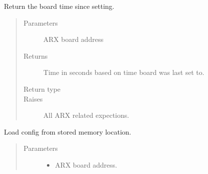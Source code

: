 \documentclass[letterpaper,10pt,english]{sphinxmanual}
\begin{document}
\begin{fulllineitems}
\begin{fulllineitems}
\begin{quote}
\begin{description}
\end{description}\end{quote}

\end{fulllineitems}


\begin{fulllineitems}
\label{\detokenize{index:lwautils.lwa_arx.ARX.get_time}}
Return the board time since setting.
\begin{quote}\begin{description}
\item[{Parameters}] \leavevmode
{} \textendash{} ARX board address

\item[{Returns}] \leavevmode
Time in seconds based on time board was last set to.

\item[{Return type}] \leavevmode
{}

\item[{Raises}] \leavevmode
{} \textendash{} All ARX related expections.

\end{description}\end{quote}

\end{fulllineitems}


\begin{fulllineitems}
\label{\detokenize{index:lwautils.lwa_arx.ARX.load_cfg}}
Load config from stored memory location.
\begin{quote}\begin{description}
\item[{Parameters}] \leavevmode\begin{itemize}
\item {} 
 \textendash{} ARX board address.


\end{itemize}
\end{description}
\end{quote}
\end{fulllineitems}
\end{fulllineitems}
\end{document}
